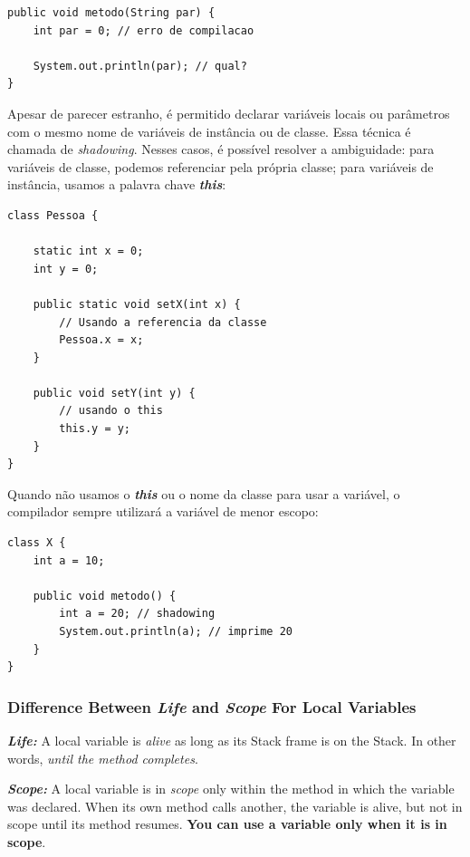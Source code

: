 \documentclass[12pt]{article}
\begin{document}
\begin{lstlisting}
public void metodo(String par) {
	int par = 0; // erro de compilacao
	
	System.out.println(par); // qual?
}
\end{lstlisting}

Apesar de parecer estranho, é permitido declarar variáveis locais ou parâmetros com o mesmo nome de variáveis de instância ou de classe. Essa técnica é chamada de \textit{shadowing}. Nesses casos, é possível resolver a ambiguidade: para variáveis de classe, podemos referenciar pela própria classe; para variáveis de instância, usamos a palavra chave \textbf{\textit{this}}:

\begin{lstlisting}
class Pessoa {
	
	static int x = 0;
	int y = 0;
	
	public static void setX(int x) {
		// Usando a referencia da classe
		Pessoa.x = x;
	}
	
	public void setY(int y) {
		// usando o this
		this.y = y;
	}
}
\end{lstlisting}
\pagebreak
Quando não usamos o \textbf{\textit{this}} ou o nome da classe para usar a variável, o compilador sempre utilizará a variável de menor escopo:

\begin{lstlisting}
class X {
	int a = 10;
	
	public void metodo() {
		int a = 20; // shadowing
		System.out.println(a); // imprime 20
	}
}
\end{lstlisting}

\subsubsection{Difference Between \textit{Life} and \textit{Scope} For Local Variables}

\textbf{\textit{Life:}} A local variable is \textit{alive} as long as its Stack frame is on the Stack. In other words, \textit{until the method completes}.

\textbf{\textit{Scope:}} A local variable is in \textit{scope} only within the method in which the variable was declared. When its own method calls another, the variable is alive, but not in scope until its method resumes. \textbf{You can use a variable only when it is in scope}.
\end{document}
